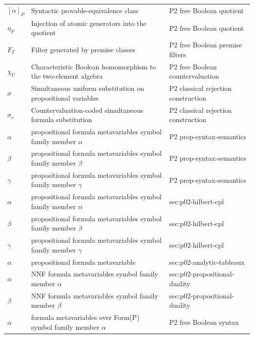 \begin{longtable}{@{}p{}p{}p{}@{}}
\([\alpha]_P\) & Syntactic provable-equivalence class & P2 free Boolean quotient \\
\(\eta_P\) & Injection of atomic generators into the quotient & P2 free Boolean quotient \\
\(F_\Gamma\) & Filter generated by premise classes & P2 free Boolean premise filters \\
\(\chi_U\) & Characteristic Boolean homomorphism to the two-element algebra & P2 free Boolean countervaluation \\
\ensuremath{\sigma} & Simultaneous uniform substitution on propositional variables & P2 classical rejection construction \\
\ensuremath{\sigma_v} & Countervaluation-coded simultaneous formula substitution & P2 classical rejection construction \\
\(\alpha\) & propositional formula metavariables symbol family member \(\alpha\) & P2 prop-\allowbreak{}syntax-\allowbreak{}semantics \\
\(\beta\) & propositional formula metavariables symbol family member \(\beta\) & P2 prop-\allowbreak{}syntax-\allowbreak{}semantics \\
\(\gamma\) & propositional formula metavariables symbol family member \(\gamma\) & P2 prop-\allowbreak{}syntax-\allowbreak{}semantics \\
\(\alpha\) & propositional formula metavariables symbol family member \(\alpha\) & sec:\allowbreak{}p02-\allowbreak{}hilbert-\allowbreak{}cpl \\
\(\beta\) & propositional formula metavariables symbol family member \(\beta\) & sec:\allowbreak{}p02-\allowbreak{}hilbert-\allowbreak{}cpl \\
\(\gamma\) & propositional formula metavariables symbol family member \(\gamma\) & sec:\allowbreak{}p02-\allowbreak{}hilbert-\allowbreak{}cpl \\
\(\alpha\) & propositional formula metavariable & sec:\allowbreak{}p02-\allowbreak{}analytic-\allowbreak{}tableaux \\
\(\alpha\) & NNF formula metavariables symbol family member \(\alpha\) & sec:\allowbreak{}p02-\allowbreak{}propositional-\allowbreak{}duality \\
\(\beta\) & NNF formula metavariables symbol family member \(\beta\) & sec:\allowbreak{}p02-\allowbreak{}propositional-\allowbreak{}duality \\
\(\alpha\) & formula metavariables over Form(P) symbol family member \(\alpha\) & P2 free Boolean syntax \\

\end{longtable}
